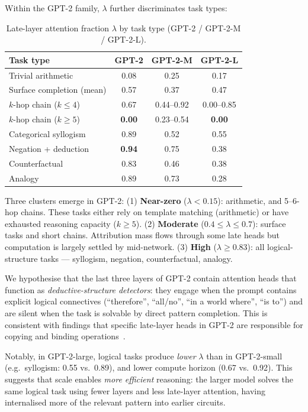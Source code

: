 \documentclass{article}
\begin{document}
Within the GPT-2 family, $\lambda$ further discriminates task types:

\begin{table}[h]
\centering
\caption{Late-layer attention fraction $\lambda$ by task type (GPT-2 / GPT-2-M / GPT-2-L).}
\label{tab:late_attn}
\small
\begin{tabular}{lccc}
\toprule
\textbf{Task type} & \textbf{GPT-2} & \textbf{GPT-2-M} & \textbf{GPT-2-L} \\
\midrule
Trivial arithmetic         & 0.08 & 0.25 & 0.17 \\
Surface completion (mean)  & 0.57 & 0.37 & 0.47 \\
$k$-hop chain ($k\leq4$)   & 0.67 & 0.44--0.92 & 0.00--0.85 \\
$k$-hop chain ($k\geq5$)   & \textbf{0.00} & 0.23--0.54 & \textbf{0.00} \\
Categorical syllogism      & 0.89 & 0.52 & 0.55 \\
Negation + deduction       & \textbf{0.94} & 0.75 & 0.38 \\
Counterfactual             & 0.83 & 0.46 & 0.38 \\
Analogy                    & 0.89 & 0.73 & 0.28 \\
\bottomrule
\end{tabular}
\end{table}

Three clusters emerge in GPT-2:
(1) \textbf{Near-zero} ($\lambda < 0.15$): arithmetic, and 5--6-hop
chains. These tasks either rely on template matching (arithmetic) or
have exhausted reasoning capacity ($k \geq 5$).
(2) \textbf{Moderate} ($0.4 \leq \lambda \leq 0.7$): surface tasks and
short chains. Attribution mass flows through some late heads but
computation is largely settled by mid-network.
(3) \textbf{High} ($\lambda \geq 0.83$): all logical-structure tasks
— syllogism, negation, counterfactual, analogy.

We hypothesise that the last three layers of GPT-2 contain attention
heads that function as \emph{deductive-structure detectors}: they engage
when the prompt contains explicit logical connectives (``therefore'',
``all/no'', ``in a world where'', ``is to'') and are silent when the
task is solvable by direct pattern completion.
This is consistent with findings that specific late-layer heads in GPT-2
are responsible for copying and binding operations~\citep{olsson2022context}.

Notably, in GPT-2-large, logical tasks produce \emph{lower} $\lambda$
than in GPT-2-small (e.g.\ syllogism: 0.55 vs.\ 0.89), and lower
compute horizon (0.67 vs.\ 0.92).
This suggests that scale enables \emph{more efficient} reasoning:
the larger model solves the same logical task using fewer layers and
less late-layer attention, having internalised more of the relevant
pattern into earlier circuits.
\end{document}
